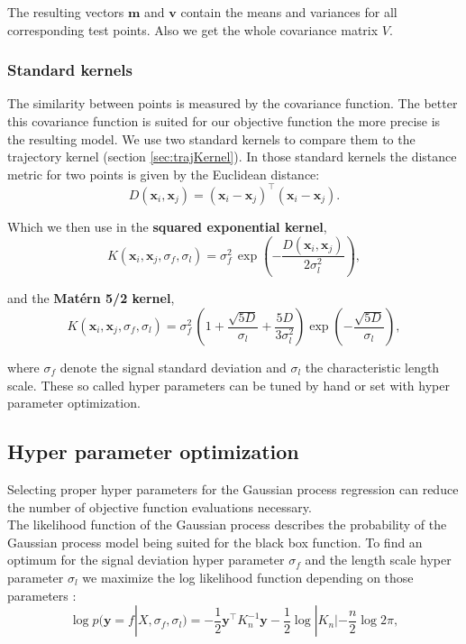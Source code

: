 The resulting vectors $\mathbf{m}$ and $\mathbf{v}$ contain the means and variances for all corresponding test points. Also we get the whole covariance matrix $V$.

\subsubsection{Standard kernels}
The similarity between points is measured by the covariance function. The better this covariance function is suited for our objective function the more precise is the resulting model.
We use two standard kernels \cite{rasmussen2006gaussian} to compare them to the trajectory kernel (section \ref{sec:trajKernel}). In those standard kernels the distance metric for two points is given by the Euclidean distance:
$$D(\mathbf{x}_i,\mathbf{x}_j) = (\mathbf{x}_i-\mathbf{x}_j)^\top (\mathbf{x}_i-\mathbf{x}_j).$$

Which we then use in the \textbf{squared exponential kernel},
$$K(\mathbf{x}_i,\mathbf{x}_j,\sigma_f,\sigma_l) = \sigma_{f}^{2}\,\exp\left(-\frac{D(\mathbf{x}_i,\mathbf{x}_j)}{2\sigma_l^2} \right), $$

and the \textbf{Mat\'{e}rn 5/2 kernel},
$$K(\mathbf{x}_i,\mathbf{x}_j,\sigma_f,\sigma_l) = \sigma_{f}^{2}\,\left(1 + \frac{\sqrt{5 D}}{\sigma_l} + \frac{5 D}{3\sigma_l^2} \right) \exp\left(-\frac{\sqrt{5 D}}{\sigma_l} \right),$$

where $\sigma_f$ denote the signal standard deviation and $\sigma_l$ the characteristic length scale. These so called hyper parameters can be tuned by hand or set with hyper parameter optimization.

\subsection{Hyper parameter optimization}

Selecting proper hyper parameters for the Gaussian process regression can reduce the number of objective function evaluations necessary.\\
The likelihood function of the Gaussian process describes the probability of the Gaussian process model being suited for the black box function. To find an optimum for the signal deviation hyper parameter $\sigma_f$ and the length scale hyper parameter $\sigma_l$ we maximize the log likelihood function depending on those parameters \cite{lizotte2008practical}:
\begin{equation} \label{eq:hypOpt}
    \log p(\mathbf{y} = f|X,\sigma_f,\sigma_l) = -\frac{1}{2} \mathbf{y}^\top K_n^{-1} \mathbf{y} -\frac{1}{2} \log |K_n| -\frac{n}{2}\log 2\pi,
\end{equation}

